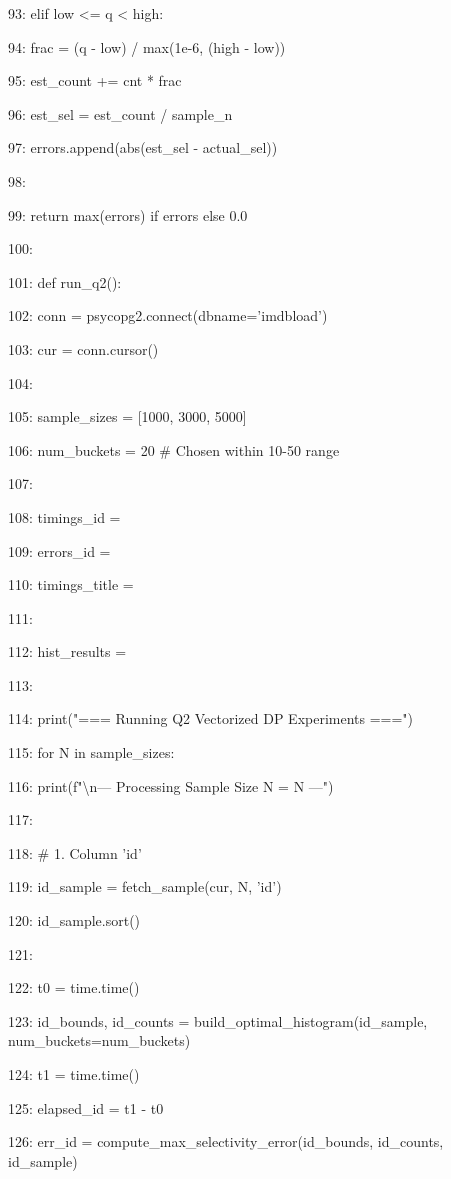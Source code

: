 \documentclass[11pt,a4paper]{article}
\begin{document}
{93:             elif low <= q < high:

94:                 frac = (q - low) / max(1e-6, (high - low))

95:                 est\_count += cnt * frac

96:         est\_sel = est\_count / sample\_n

97:         errors.append(abs(est\_sel - actual\_sel))

98:

99:     return max(errors) if errors else 0.0

100:

101: def run\_q2():

102:     conn = psycopg2.connect(dbname='imdbload')

103:     cur = conn.cursor()

104:

105:     sample\_sizes = [1000, 3000, 5000]

106:     num\_buckets = 20 \# Chosen within 10-50 range

107:

108:     timings\_id = {}

109:     errors\_id = {}

110:     timings\_title = {}

111:

112:     hist\_results = {}

113:

114:     print("=== Running Q2 Vectorized DP Experiments ===")

115:     for N in sample\_sizes:

116:         print(f"\textbackslash{}n--- Processing Sample Size N = {N} ---")

117:

118:         \# 1. Column 'id'

119:         id\_sample = fetch\_sample(cur, N, 'id')

120:         id\_sample.sort()

121:

122:         t0 = time.time()

123:         id\_bounds, id\_counts = build\_optimal\_histogram(id\_sample, num\_buckets=num\_buckets)

124:         t1 = time.time()

125:         elapsed\_id = t1 - t0

126:         err\_id = compute\_max\_selectivity\_error(id\_bounds, id\_counts, id\_sample)

}
\end{document}
